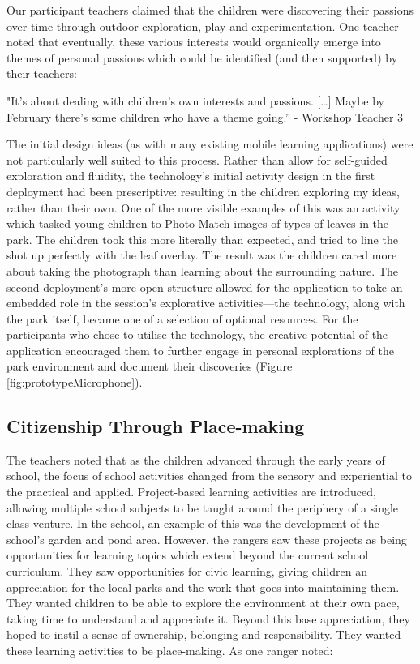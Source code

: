 Our participant teachers claimed that the children were discovering their passions over time through outdoor exploration, play and experimentation. One teacher noted that eventually, these various interests would organically emerge into themes of personal passions which could be identified (and then supported) by their teachers:

\begin{displayquote}
"It’s about dealing with children’s own interests and passions. […] Maybe by February there’s some children who have a theme going.” - Workshop Teacher 3
\end{displayquote}

The initial design ideas (as with many existing mobile learning applications) were not particularly well suited to this process. Rather than allow for self-guided exploration and fluidity, the technology’s initial activity design in the first deployment had been prescriptive: resulting in the children exploring my ideas, rather than their own. One of the more visible examples of this was an activity which tasked young children to Photo Match images of types of leaves in the park. The children took this more literally than expected, and tried to line the shot up perfectly with the leaf overlay. The result was the children cared more about taking the photograph than learning about the surrounding nature. The second deployment’s more open structure allowed for the application to take an embedded role in the session’s explorative activities---the technology, along with the park itself, became one of a selection of optional resources. For the participants who chose to utilise the technology, the creative potential of the application encouraged them to further engage in personal explorations of the park environment and document their discoveries (Figure \ref{fig:prototypeMicrophone}).

\subsection{Citizenship Through Place-making}

The teachers noted that as the children advanced through the early years of school, the focus of school activities changed from the sensory and experiential to the practical and applied. Project-based learning activities are introduced, allowing multiple school subjects to be taught around the periphery of a single class venture. In the school, an example of this was the development of the school’s garden and pond area. However, the rangers saw these projects as being opportunities for learning topics which extend beyond the current school curriculum.  They saw opportunities for civic learning, giving children an appreciation for the local parks and the work that goes into maintaining them. They wanted children to be able to explore the environment at their own pace, taking time to understand and appreciate it. Beyond this base appreciation, they hoped to instil a sense of ownership, belonging and responsibility. They wanted these learning activities to be place-making. As one ranger noted:

